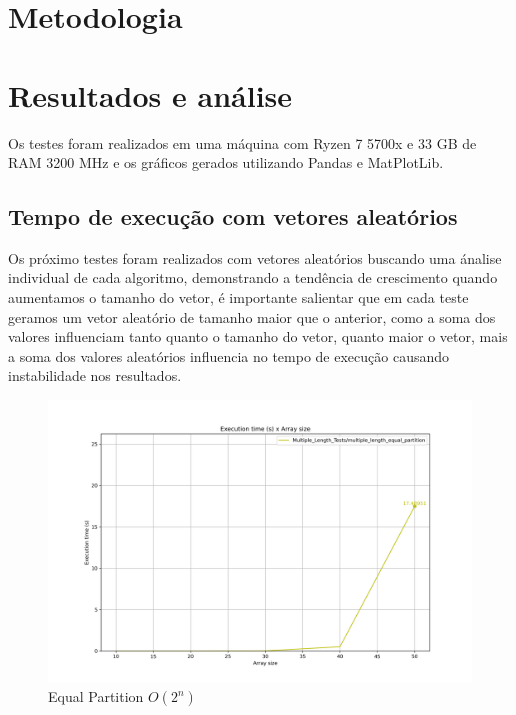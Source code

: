 \documentclass{article}
\begin{document}
\section{Metodologia}

\section{Resultados e análise}
Os testes foram realizados em uma máquina com Ryzen 7 5700x e 33 GB de RAM 3200 MHz e os gráficos gerados utilizando Pandas e MatPlotLib.

\subsection{Tempo de execução com vetores aleatórios}

Os próximo testes foram realizados com vetores aleatórios buscando uma ánalise individual de cada algoritmo, demonstrando a tendência de crescimento quando aumentamos o tamanho do vetor, é importante salientar que em cada teste geramos um vetor aleatório de tamanho maior que o anterior, como a soma dos valores influenciam tanto quanto o tamanho do vetor, quanto maior o vetor, mais a soma dos valores aleatórios influencia no tempo de execução causando instabilidade nos resultados. 

\begin{figure} [H]
    \centering
    \caption{Equal Partition \(O(2^n)\)}
    \includegraphics[width=1\textwidth]{images/multiple_length_equal_partition.png}
\end{figure}
\end{document}
